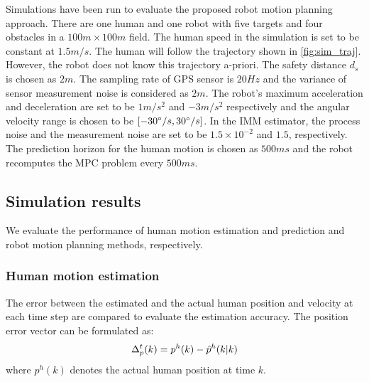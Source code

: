 \documentclass[letterpaper, 10 pt, conference]{ieeeconf}
\begin{document}
Simulations have been run to evaluate the proposed robot motion planning approach. 
There are one human and one robot with five targets and four obstacles in a $100 m\times 100 m$ field. 
The human speed in the simulation is set to be constant at $1.5m/s$. 
The human will follow the trajectory shown in \cref{fig:sim_traj}.
However, the robot does not know this trajectory a-priori.
The safety distance $d_s$ is chosen as $2m$.
The sampling rate of GPS sensor is $20Hz$ and the variance of sensor measurement noise is considered as $2m$. 
The robot's maximum acceleration and deceleration are set to be $1 m/s^2$ and $-3 m/s^2$ respectively and the angular velocity range is chosen to be $[-30\degree/s,30\degree/s]$.
In the IMM estimator, the process noise and the measurement noise are set to be $1.5\times 10^{-2}$ and $1.5$, respectively.
The prediction horizon for the human motion is chosen as $500ms$ and the robot recomputes the MPC problem every $500ms$.

\subsection{Simulation results}
We evaluate the performance of human motion estimation and prediction and robot motion planning methods, respectively.
\subsubsection{Human motion estimation}
The error between the estimated and the actual human position and velocity at each time step are compared to evaluate the estimation accuracy.
The position error vector can be formulated as:
\[
\Delta^{t}_p(k)=p^h(k)-\hat{p}^h(k|k)\label{eqn:track_err_pos}\\
\]
where $p^h(k)$ denotes the actual human position at time $k$. 




\end{document}

